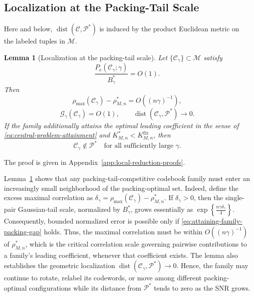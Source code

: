 \documentclass[12pt,draftclsnofoot,onecolumn]{IEEEtran}
\newcommand{\cC}{\mathcal{C}}
\newcommand{\cG}{\mathcal{G}}
\newcommand{\cM}{\mathcal{M}}
\newcommand{\cP}{\mathcal{P}}
\newcommand{\Pe}{P_{\mathrm e}}
\newtheorem{lemma}{Lemma}
\theoremstyle{definition}
\begin{document}
\subsection{Localization at the Packing-Tail Scale}
\label{subsec:coefficient-attaining-localization}

Here and below, \(\operatorname{dist}(\cC,\cP^{\ast})\) is induced by
the product Euclidean metric on the labeled tuples in \(\cM\).

\begin{lemma}[Localization at the packing-tail scale]
\label{lem:coefficient-attaining-localization}
Let \(\{\cC_\gamma\}\subset\cM\) satisfy
\begin{equation}
  \frac{\Pe(\cC_\gamma;\gamma)}{B_\gamma^{\ast}}=O(1).
  \label{eq:packing-tail-competitive-family}
\end{equation}
Then
\begin{equation}
  \rho_{\max}(\cC_\gamma)-\rho^{\ast}_{M,n}
  =O((n\gamma)^{-1}),
  \label{eq:attaining-family-packing-gap}
\end{equation}
\begin{equation}
  \cG_\gamma(\cC_\gamma)=O(1),
  \qquad
  \operatorname{dist}(\cC_\gamma,\cP^{\ast})\longrightarrow0.
  \label{eq:attaining-family-Pstar-localization}
\end{equation}
If the family additionally attains the optimal leading coefficient in the
sense of \eqref{eq:central-problem-attainment} and
\(K^{\ast}_{M,n}<K^{\mathrm{fix}}_{M,n}\), then
\begin{equation}
  \cC_\gamma\notin\cP^{\ast}
  \quad\text{for all sufficiently large \(\gamma\)}.
  \label{eq:attaining-family-eventually-outside-Pstar}
\end{equation}
\end{lemma}


\begin{IEEEproof}
The proof is given in
Appendix~\ref{app:local-reduction-proofs}.
\end{IEEEproof}

Lemma~\ref{lem:coefficient-attaining-localization} shows that any
packing-tail-competitive codebook family must enter an increasingly
small neighborhood of the packing-optimal set.
Indeed, define the excess maximal correlation as
\(\delta_\gamma=
\rho_{\max}(\cC_\gamma)-\rho^{\ast}_{M,n}\).
If \(\delta_\gamma>0\), then the single-pair Gaussian-tail scale,
normalized by \(B_\gamma^{\ast}\), grows essentially as
\(
\exp\!\left\{\frac{n\gamma\delta_\gamma}{4}\right\}.
\)
Consequently, bounded normalized error is possible only if
\eqref{eq:attaining-family-packing-gap} holds.
Thus, the maximal correlation must be within
\(O((n\gamma)^{-1})\) of \(\rho^{\ast}_{M,n}\), which is the critical
correlation scale governing pairwise contributions to a family's leading
coefficient, whenever that coefficient exists.
The lemma also establishes the geometric localization
\(\operatorname{dist}(\cC_\gamma,\cP^{\ast})\longrightarrow0\).
Hence, the family may continue
to rotate, relabel its codewords, or move among different packing-optimal
configurations while its distance from \(\cP^{\ast}\) tends to
zero as the SNR grows.
\end{document}
